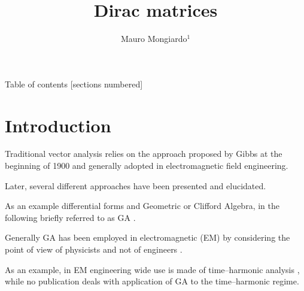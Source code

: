 \documentclass[handout,10pt]{beamer}
\title{Dirac matrices}
\date{}
\author{ Mauro Mongiardo$^1$}
\institute{
 $^1$ Department of Engineering, University of Perugia, Perugia, Italy.
}
\begin{document}
\maketitle

\begin{frame}{Table of contents}
  [sections numbered]
  \tableofcontents[hideallsubsections]
\end{frame}

\section{Introduction}

\begin{frame}[fragile]{}

Traditional vector analysis relies on the approach proposed by Gibbs at the beginning of 1900 \cite{gibbs} and generally adopted in electromagnetic field engineering.

Later, several different approaches have been presented and elucidated.

As an example differential forms \cite{russer} and Geometric or Clifford Algebra, in the following briefly referred to as GA \cite{hestenes}\cite{seagar}. 

\alert{Generally GA has been employed in electromagnetic (EM) by considering the point of view of physicists and not of engineers \cite{arthur}\cite{abbott}.}

As an example, in EM  engineering  wide use is made of time--harmonic analysis \cite{harrington}, while no publication deals with application of GA to the time--harmonic regime.

\end{frame}
\end{document}
